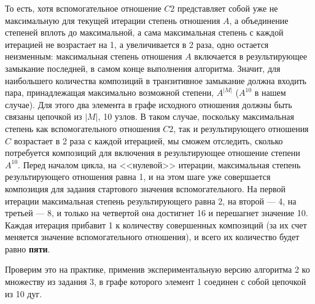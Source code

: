 \documentclass[12pt]{article}
\begin{document}
	То есть, хотя вспомогательное отношение $C2$ представляет собой уже не максимальную для текущей итерации степень отношения $A$, а объединение степеней вплоть до максимальной, а сама максимальная степень с каждой итерацией не возрастает на 1, а увеличивается в 2 раза, одно остается неизменным: максимальная степень отношения $A$ включается в результирующее замыкание последней, в самом конце выполнения алгоритма. Значит, для наибольшего количества композиций в транзитивное замыкание должна входить пара, принадлежащая максимально возможной степени, $A^{|M|}$ ($A^{10}$ в нашем случае). Для этого два элемента в графе исходного отношения должны быть связаны цепочкой из $|M|$, 10 узлов. В таком случае, поскольку максимальная степень как вспомогательного отношения $C2$, так и результирующего отношения $C$ возрастает в 2 раза с каждой итерацией, мы сможем отследить, сколько потребуется композиций для включения в результирующее отношение степени $A^{10}$. Перед началом цикла, на <<нулевой>> итерации, максимальная степень результирующего отношения равна 1, и на этом шаге уже совершается композиция для задания стартового значения вспомогательного. На первой итерации максимальная степень результирующего равна 2, на второй --- 4, на третьей --- 8, и только на четвертой она достигнет 16 и перешагнет значение 10. Каждая итерация прибавит 1 к количеству совершенных композиций (за их счет меняется значение вспомогательного отношения), и всего их количество будет равно {\bf пяти}.
	
	Проверим это на практике, применив экспериментальную версию алгоритма 2 ко множеству из задания 3, в графе которого элемент 1 соединен с собой цепочкой из 10 дуг.
	
	 

	
	\begin{figure}[h]
		\noindent{}
	\end{figure}
	
\end{document}
